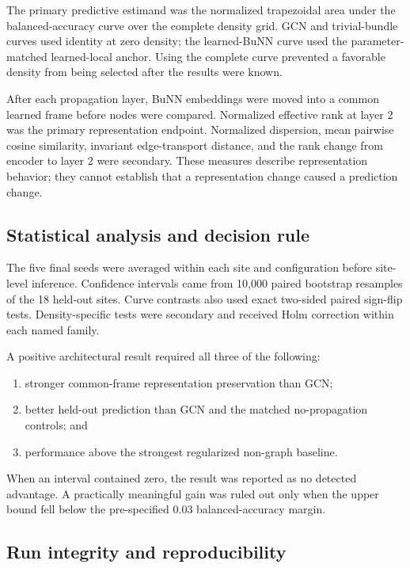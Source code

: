 \documentclass[11pt,a4paper]{article}
\begin{document}
The primary predictive estimand was the normalized trapezoidal area under the
balanced-accuracy curve over the complete density grid. GCN and trivial-bundle
curves used identity at zero density; the learned-BuNN curve used the
parameter-matched learned-local anchor. Using the complete curve prevented a
favorable density from being selected after the results were known.

After each propagation layer, BuNN embeddings were moved into a common learned
frame before nodes were compared. Normalized effective rank at layer 2 was the
primary representation endpoint. Normalized dispersion, mean pairwise cosine
similarity, invariant edge-transport distance, and the rank change from encoder
to layer 2 were secondary. These measures describe representation behavior;
they cannot establish that a representation change caused a prediction change.

\subsection{Statistical analysis and decision rule}

The five final seeds were averaged within each site and configuration before
site-level inference. Confidence intervals came from 10,000 paired bootstrap
resamples of the 18 held-out sites. Curve contrasts also used exact two-sided
paired sign-flip tests. Density-specific tests were secondary and received
Holm correction within each named family.

A positive architectural result required all three of the following:
\begin{enumerate}
  \item stronger common-frame representation preservation than GCN;
  \item better held-out prediction than GCN and the matched no-propagation
  controls; and
  \item performance above the strongest regularized non-graph baseline.
\end{enumerate}

When an interval contained zero, the result was reported as no detected
advantage. A practically meaningful gain was ruled out only when the upper
bound fell below the pre-specified 0.03 balanced-accuracy margin.

\subsection{Run integrity and reproducibility}
\end{document}
